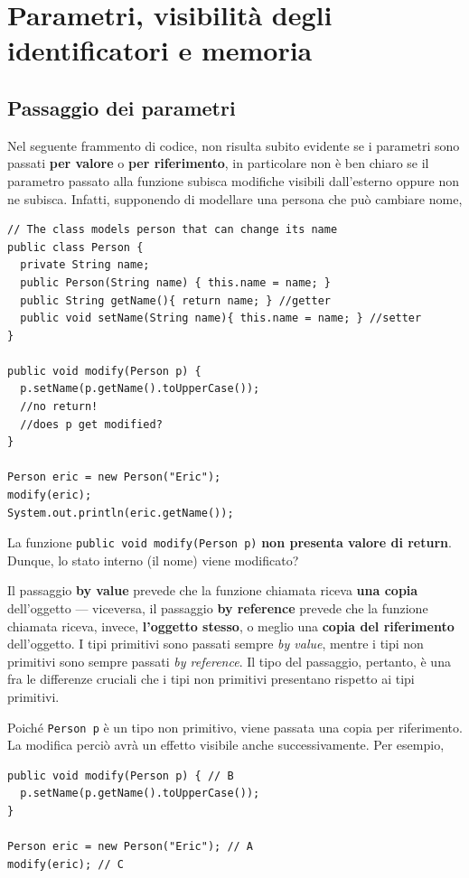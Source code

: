 \documentclass[\fontsizeclass,twocolumn]{\classname}
\theoremstyle{definition}
\theoremstyle{definition}
\begin{document}
\chapter{Parametri, visibilità degli identificatori e memoria}
\section{Passaggio dei parametri}

Nel seguente frammento di codice, non risulta subito evidente se i parametri
sono passati \textbf{per valore} o \textbf{per riferimento}, in particolare non
è ben chiaro se il parametro passato alla funzione subisca modifiche visibili
dall'esterno oppure non ne subisca. Infatti, supponendo di modellare una
persona che può cambiare nome,

\begin{lstlisting}
// The class models person that can change its name
public class Person {
  private String name;
  public Person(String name) { this.name = name; }
  public String getName(){ return name; } //getter
  public void setName(String name){ this.name = name; } //setter
}

public void modify(Person p) {
  p.setName(p.getName().toUpperCase());
  //no return!
  //does p get modified?
}

Person eric = new Person("Eric");
modify(eric);
System.out.println(eric.getName());
\end{lstlisting}

La funzione \texttt{public void modify(Person p)} \textbf{non presenta valore
di return}. Dunque, lo stato interno (il nome) viene modificato?

Il passaggio \textbf{by value} prevede che la funzione chiamata riceva
\textbf{una copia} dell'oggetto \---- viceversa, il passaggio \textbf{by
reference} prevede che la funzione chiamata riceva, invece, \textbf{l'oggetto
stesso}, o meglio una \textbf{copia del riferimento} dell'oggetto. I tipi
primitivi sono passati sempre \emph{by value}, mentre i tipi non primitivi sono
sempre passati \emph{by reference}. Il tipo del passaggio, pertanto, è una fra
le differenze cruciali che i tipi non primitivi presentano rispetto ai tipi
primitivi.

Poiché \texttt{Person p} è un tipo non primitivo, viene passata una copia per
riferimento. La modifica perciò avrà un effetto visibile anche successivamente.
Per esempio,

\begin{lstlisting}
public void modify(Person p) { // B
  p.setName(p.getName().toUpperCase());
}

Person eric = new Person("Eric"); // A
modify(eric); // C
\end{lstlisting}
\end{document}
